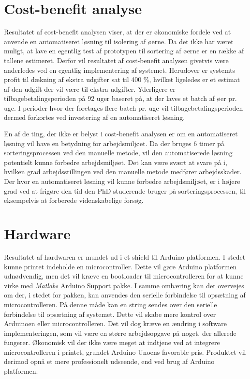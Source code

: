 \section{Cost-benefit analyse}
Resultatet af cost-benefit analysen viser, at der er økonomiske fordele ved at anvende en automatiseret løsning til isolering af øerne. Da det ikke har været muligt, at lave en egentlig test af prototypen til sortering af øerne er en række af tallene estimeret. Derfor vil resultatet af cost-benefit analysen givetvis være anderledes ved en egentlig implementering af systemet. Herudover er systemts profit til dækning af ekstra udgifter sat til 400 \%, hvilket ligeledes er et estimat af den udgift der vil være til ekstra udgifter. Yderligere er tilbagebetalingsperioden på 92 uger baseret på, at der laves et batch af øer pr. uge. I perioder hvor der foretages flere batch pr. uge vil tilbagebetalingsperioden dermed forkortes ved investering af en automatiseret løsning.

En af de ting, der ikke er belyst i cost-benefit analysen er om en automatiseret løsning vil have en betydning for arbejdsmiljøet. Da der bruges 6 timer på sorteringsprocessen ved den manuelle metode, vil den automatiserede løsning potentielt kunne forbedre arbejdsmiljøet. Det kan være svært at svare på i, hvilken grad arbejdsstillingen ved den manuelle metode medfører arbejdsskader. Der hvor en automatiseret løsning vil kunne forbedre arbejdsmiljøet, er i højere grad ved at frigøre den tid den PhD studerende bruger på sorteringsprocessen, til eksempelvis at forberede videnskabelige forsøg.

\section{Hardware}
Resultatet af hardwaren er mundet ud i et shield til Arduino platformen. I stedet kunne printet indeholde en microcontroller. Dette vil gøre Arduino platformen udnødvendig, men det vil kræve en bootloader til microcontrolleren for at kunne virke med \textit{Matlabs} Arduino Support pakke. I samme ombæring kan det overvejes om der, i stedet for pakken, kan anvendes den serielle forbindelse til opsætning af microcontrolleren. På denne måde kan en string sendes over den serielle forbindelse til opsætning af systemet. Dette vil skabe mere kontrol over Arduinoen eller microcontrolleren. Det vil dog kræve en ændring i software implementeringen, som vil være en større arbejdsopgave på noget, der allerede fungerer. Økonomisk vil der ikke være meget at indtjene ved at integrere microcontrolleren i printet, grundet Arduino Unoens favorable pris. Produktet vil derimod opnå et mere professionelt udseende, end ved brug af Arduino platformen.

